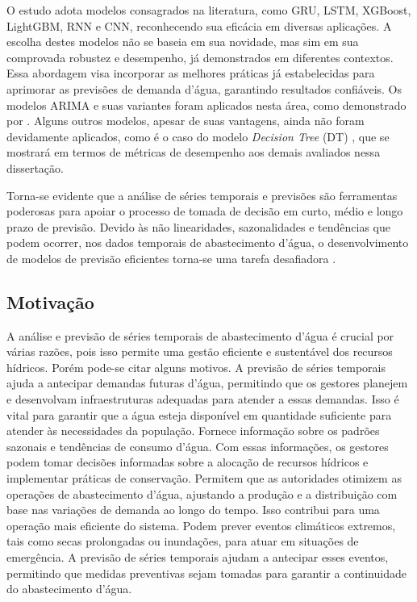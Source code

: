 O estudo adota modelos consagrados na literatura, como GRU, LSTM, XGBoost, LightGBM, RNN e CNN, reconhecendo sua eficácia em diversas aplicações. A escolha destes modelos não se baseia em sua novidade, mas sim em sua comprovada robustez e desempenho, já demonstrados em diferentes contextos. Essa abordagem visa incorporar as melhores práticas já estabelecidas para aprimorar as previsões de demanda d'água, garantindo resultados confiáveis. Os modelos ARIMA e suas variantes foram aplicados nesta área, como demonstrado por \cite{2-s2.0-85069459067, 2-s2.0-85099424908}. Alguns outros modelos, apesar de suas vantagens, ainda não foram devidamente aplicados, como é o caso do modelo \textit{Decision Tree} (DT) \cite{2-s2.0-85054695177}, que se mostrará em termos de métricas de desempenho aos demais avaliados nessa dissertação.

Torna-se evidente que a análise de séries temporais e previsões são ferramentas poderosas para apoiar o processo de tomada de decisão em curto, médio e longo prazo de previsão. Devido às não linearidades, sazonalidades e tendências que podem ocorrer, nos dados temporais de abastecimento d'água, o desenvolvimento de modelos de previsão eficientes torna-se uma tarefa desafiadora \cite{mateus}.



\subsection{Motiva\c c\~ao} 
\label{subsubsec:motivacao}

A análise e previsão de séries temporais de abastecimento d'água é crucial por várias razões, pois isso permite uma gestão eficiente e sustentável dos recursos hídricos. Porém pode-se citar alguns motivos. A previsão de séries temporais ajuda a antecipar demandas futuras d'água, permitindo que os gestores planejem e desenvolvam infraestruturas adequadas para atender a essas demandas. Isso é vital para garantir que a água esteja disponível em quantidade suficiente para atender às necessidades da população. Fornece informação sobre os padrões sazonais e tendências de consumo d'água. Com essas informações, os gestores podem tomar decisões informadas sobre a alocação de recursos hídricos e implementar práticas de conservação. Permitem que as autoridades otimizem as operações de abastecimento d'água, ajustando a produção e a distribuição com base nas variações de demanda ao longo do tempo. Isso contribui para uma operação mais eficiente do sistema. Podem prever eventos climáticos extremos, tais como secas prolongadas ou inundações, para atuar em situações de emergência. A previsão de séries temporais ajudam a antecipar esses eventos, permitindo que medidas preventivas sejam tomadas para garantir a continuidade do abastecimento d'água.

